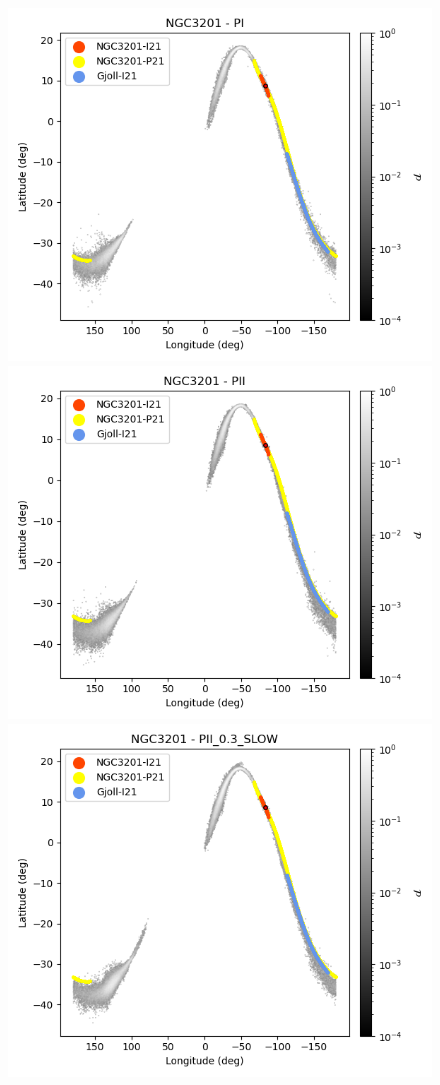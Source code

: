             \begin{figure}[h!]
                \begin{center}
                    \includegraphics[clip=true, trim = 0mm 0mm 0mm 0mm, width=0.65\columnwidth]{images/PI_individual_NGC3201_galstream-NGC3201-l-b.png}
                    \includegraphics[clip=true, trim = 0mm 0mm 0mm 0mm, width=0.65\columnwidth]{images/PII_individual_NGC3201_galstream-NGC3201-l-b.png}
                    \includegraphics[clip=true, trim = 0mm 0mm 0mm 0mm, width=0.65\columnwidth]{images/PII_0.3_SLOW_individual_NGC3201_galstream-NGC3201-l-b.png}


\end{center}
\end{figure}
